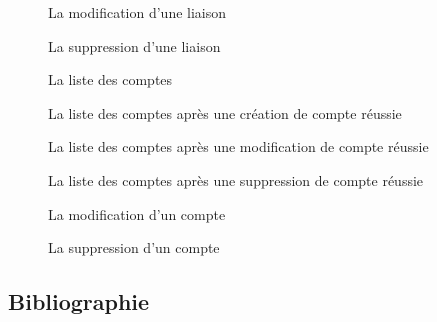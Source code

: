 \documentclass[a4paper,french,8pt]{article}
\begin{document}
		\begin{figure}[h!]
			\caption{La modification d'une liaison}
			\centering
		\end{figure} 
		
		
		
		\begin{figure}[h!]
			\caption{La suppression d'une liaison}
			\centering
		\end{figure}
		
			
		\begin{figure}[h!]
			\caption{La liste des comptes}
			\centering
		\end{figure} 
		
		\begin{figure}[h!]
			\caption{La liste des comptes après une création de compte réussie}
			\centering
		\end{figure}
		
		\begin{figure}[h!]
			\caption{La liste des comptes après une modification de compte réussie}
			\centering
		\end{figure} 
		\clearpage
		\begin{figure}[h!]
			\caption{La liste des comptes après une suppression de compte réussie}
			\centering
		\end{figure} 
		
		\begin{figure}[h!]
			\caption{La modification d'un compte}
			\centering
		\end{figure} 
		
		\begin{figure}[h!]
			\caption{La suppression d'un compte}
			\centering
		\end{figure} 
	
	
	
	\subsection{Bibliographie}
	
\end{document}
